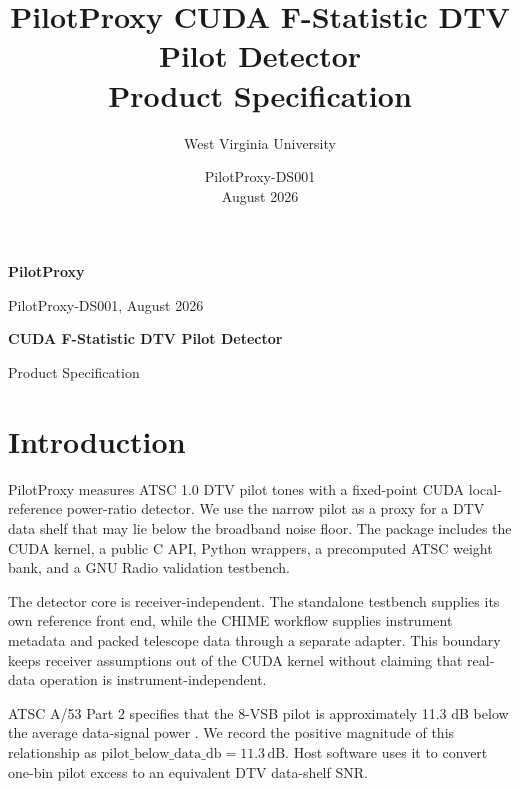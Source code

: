 \documentclass[10pt,letterpaper]{article}
\title{PilotProxy CUDA F-Statistic DTV Pilot Detector\\Product Specification}
\author{West Virginia University}
\date{PilotProxy-DS001 \\ August 2026}
\newcommand{\dB}{\,\mathrm{dB}}
\begin{document}
\thispagestyle{fancy}
{\sffamily
\begin{minipage}[t]{0.39\textwidth}
  {\fontsize{24}{26}\selectfont\bfseries\color{FStatRed}PilotProxy}\par
  {\small PilotProxy-DS001, August 2026}
\end{minipage}
\hfill
\begin{minipage}[t]{0.58\textwidth}
  \raggedleft
  {\fontsize{18}{20}\selectfont\bfseries CUDA F-Statistic DTV Pilot Detector}\par
  {\small Product Specification}
\end{minipage}
}

\vspace{0.14in}

\begin{minipage}[t]{0.48\textwidth}
\section*{Introduction}
PilotProxy measures ATSC 1.0 DTV pilot tones with a fixed-point CUDA local-reference power-ratio detector. We use the narrow pilot as a proxy for a DTV data shelf that may lie below the broadband noise floor. The package includes the CUDA kernel, a public C API, Python wrappers, a precomputed ATSC weight bank, and a GNU Radio validation testbench.

The detector core is receiver-independent. The standalone testbench supplies its own reference front end, while the CHIME workflow supplies instrument metadata and packed telescope data through a separate adapter. This boundary keeps receiver assumptions out of the CUDA kernel without claiming that real-data operation is instrument-independent.

ATSC A/53 Part 2 specifies that the 8-VSB pilot is approximately 11.3 dB below the average data-signal power \cite{atsc_a53_part2_2011}. We record the positive magnitude of this relationship as \(\mathrm{pilot\_below\_data\_db}=11.3\dB\). Host software uses it to convert one-bin pilot excess to an equivalent DTV data-shelf SNR.


\end{minipage}
\end{document}
